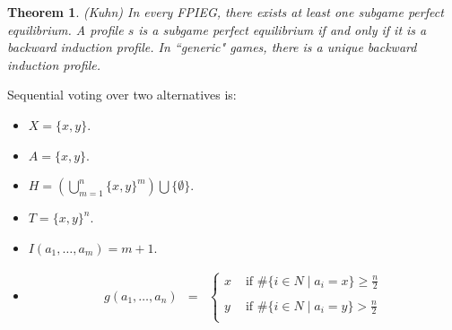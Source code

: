 \documentclass[12pt]{article}
\newtheorem{theo}[propo]{Theorem}
\newcommand{\n}{\noindent}
\newcommand{\s}{\vspace{5mm}}
\begin{document}
\s
\n\begin{theo} (Kuhn)  In every FPIEG, there exists at least one subgame perfect equilibrium.  A profile $s$ is a subgame perfect equilibrium if and only if it is a backward induction profile.  In ``generic" games, there is a unique backward induction profile.  
\end{theo}

\s
\n Sequential voting over two alternatives is:
\begin{itemize}
\item $X=\{x,y\}$.
\item $A=\{x,y\}$.
\item $H=\left(\bigcup_{m=1}^n\{x,y\}^m\right)\bigcup\{\emptyset\}$.
\item $T=\{x,y\}^n$.
\item $I(a_1,\hdots,a_m)=m+1$.
\item 
\begin{eqnarray*}
g(a_1,\hdots,a_n)&=&\left\{\begin{array}{cc}
x &\mbox{ if }\#\{i\in N\mid a_i=x\}\geq\frac{n}{2}\\
&\\
y &\mbox{ if }\#\{i\in N\mid a_i=y\}>\frac{n}{2}\\
\end{array}\right.
\end{eqnarray*}
\end{itemize}
\end{document}
